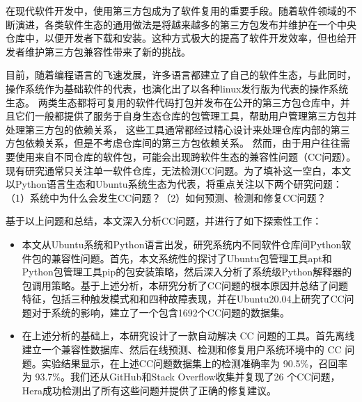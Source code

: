 \begin{cabstract}
在现代软件开发中，使用第三方包成为了软件复用的重要手段。随着软件领域的不断演进，各类软件生态的通用做法是将越来越多的第三方包发布并维护在一个中央仓库中，以便开发者下载和安装。这种方式极大的提高了软件开发效率，但也给开发者维护第三方包兼容性带来了新的挑战。

目前，随着编程语言的飞速发展，许多语言都建立了自己的软件生态，与此同时，操作系统作为基础软件的代表，也演化出了以各种linux发行版为代表的操作系统生态。
两类生态都将可复用的软件代码打包并发布在公开的第三方包仓库中，并且它们一般都提供了服务于自身生态仓库的包管理工具，帮助用户管理第三方包并处理第三方包的依赖关系，
这些工具通常都经过精心设计来处理仓库内部的第三方包依赖关系，但是不考虑仓库间的第三方包依赖关系。
然而，由于用户往往需要使用来自不同仓库的软件包，可能会出现跨软件生态的兼容性问题（CC问题）。现有研究通常只关注单一软件仓库，无法检测CC问题。为了填补这一空白，本文以Python语言生态和Ubuntu系统生态为代表，将重点关注以下两个研究问题：（1）系统中为什么会发生CC问题？（2）如何预测、检测和修复CC问题？

基于以上问题和总结，本文深入分析CC问题，并进行了如下探索性工作：
\begin{itemize}
	\item 本文从Ubuntu系统和Python语言出发，研究系统内不同软件仓库间Python软件包的兼容性问题。首先，本文系统性的探讨了Ubuntu包管理工具apt和Python包管理工具pip的包安装策略，然后深入分析了系统级Python解释器的包调用策略。基于上述分析，本研究分析了CC问题的根本原因并总结了问题特征，包括三种触发模式和和四种故障表现，并在Ubuntu20.04上研究了CC问题对于系统的影响，建立了一个包含1692个CC问题的数据集。
	\item 在上述分析的基础上，本研究设计了一款自动解决 CC 问题的工具\tool{}。\tool{}首先离线建立一个兼容性数据库、然后在线预测、检测和修复用户系统环境中的 CC 问题。实验结果显示，\tool{}在上述CC问题数据集上的检测准确率为 90.5\%，召回率为 93.7\%。我们还从GitHub和Stack Overflow收集并复现了26 个CC问题，Hera成功检测出了所有这些问题并提供了正确的修复建议。
\end{itemize}
\end{cabstract}

